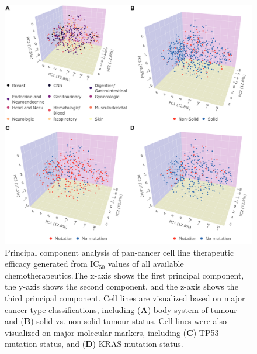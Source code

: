 \documentclass[10pt, letterpaper, twocolumn]{article}
\begin{document}
\begin{figure}[!ht]
	\centering
    \includegraphics[width=\textwidth]{Figures/initial_pca.png}

	\caption{Principal component analysis of pan-cancer cell line therapeutic efficacy generated from IC$_{50}$ values of all available chemotherapeutics.The x-axis shows the first principal component, the y-axis shows the second component, and the z-axis shows the third principal component. Cell lines are visualized based on major cancer type classifications, including (\textbf{A}) body system of tumour and (\textbf{B}) solid vs. non-solid tumour status. Cell lines were also visualized on major molecular markers, including (\textbf{C}) TP53 mutation status, and (\textbf{D}) KRAS mutation status.}
	\label{fig:overall_pca}
\end{figure}
\end{document}
